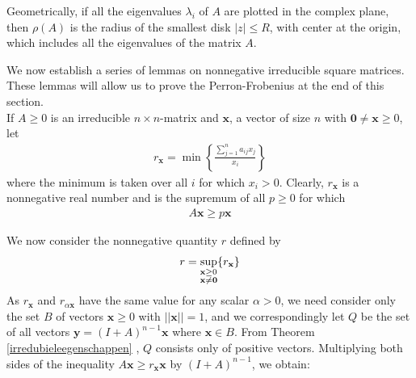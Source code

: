 \documentclass[a4paper,11pt]{report}
\begin{document}
Geometrically, if all the eigenvalues $\lambda_i$ of $A$ are plotted in the 
complex plane, then $\rho(A)$ is the radius of the smallest disk $|z| \leq 
R$, with center at the origin, which includes all the eigenvalues of the matrix 
$A$.

 We now establish a series of lemmas on nonnegative irreducible square matrices. 
 These lemmas will allow us to prove the Perron-Frobenius at the end of this
 section.\\
 
 If $A \geq 0$ is an irreducible $n\times n$-matrix and $\mathbf{x}$, a vector of size $n$ with $\mathbf{0} \not = \mathbf{x} \geq 0$, let
 \begin{eqnarray}
r_\mathbf{x} = \min\left\{\frac{\sum^n_{j=1}a_{ij}x_j}{x_i}\right\}
  \end{eqnarray}
 where the minimum is taken over all $i$ for which $x_i > 0$. Clearly, $r_\mathbf{x}$ is 
 a nonnegative real number and is the supremum of all $p \geq 0$ for 
 which 
  \begin{eqnarray}\label{eenvoudigefrob}
A\mathbf{x} \geq p\mathbf{x}  \end{eqnarray}
 
  We now consider the nonnegative quantity $r$ defined by 
 \begin{eqnarray}\label{eenvoudigefrob2}\label{quantityr}
   r = \sup_{\begin{subarray}{l}\mathbf{x} \geq 0\\
    \mathbf{x}\not = \mathbf{0}\end{subarray}} \{r_\mathbf{x}\}
 \end{eqnarray}
As $r_{\mathbf{x}}$ and $r_{\alpha\mathbf{x}}$ 
have the same value for any 
scalar $\alpha > 0$, we need consider only the set $B$ of vectors $\mathbf{x} \geq 0$ 
with $||\mathbf{x}|| = 1$, and we correspondingly let $Q$ be the set of all vectors $\mathbf{y}=(I+A)^{n-1}\mathbf{x}$ 
where $\mathbf{x} \in B$. From Theorem \ref{irredubieleegenschappen} , $Q$ 
consists only of positive vectors. Multiplying both sides of the inequality $A\mathbf{x} \geq r_{\mathbf{x}}\mathbf{x}$
by $(I+A)^{n-1}$, we obtain:
\end{document}
